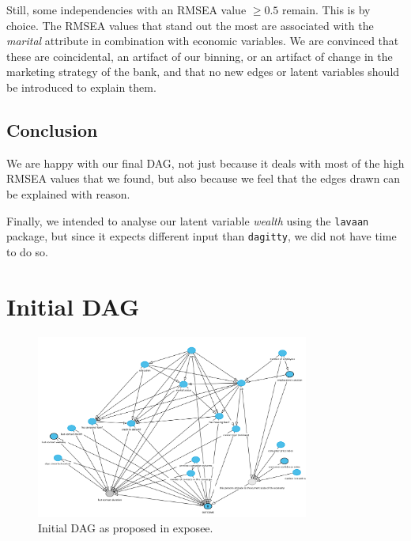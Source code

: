 \documentclass[11pt]{article}
\begin{document}
\begin{multicols}{2}
Still, some independencies with an RMSEA value $\ge 0.5$ remain. This is by choice.
The RMSEA values that stand out the most are associated with the \textit{marital} attribute in combination with economic variables.
We are convinced that these are coincidental, an artifact of our binning, or an artifact of change in the marketing strategy of the bank, and that no new edges or latent variables should be introduced to explain them.

\subsection{Conclusion}
We are happy with our final DAG, not just because it deals with most of the high RMSEA values that we found, but also because we feel that the edges drawn can be explained with reason.

Finally, we intended to analyse our latent variable \textit{wealth} using the \texttt{lavaan} package, but since it expects different input than \texttt{dagitty}, we did not have time to do so.

\newpage
\end{multicols}
\appendix
\section{Initial DAG}
\label{sec:initial_dag}
\begin{figure}[h]
	\centering
	\includegraphics[width=0.8\textwidth]{images/initial_dag}
	\caption{Initial DAG as proposed in exposee.}
	\label{fig:initial_dag}
\end{figure}
\end{document}
